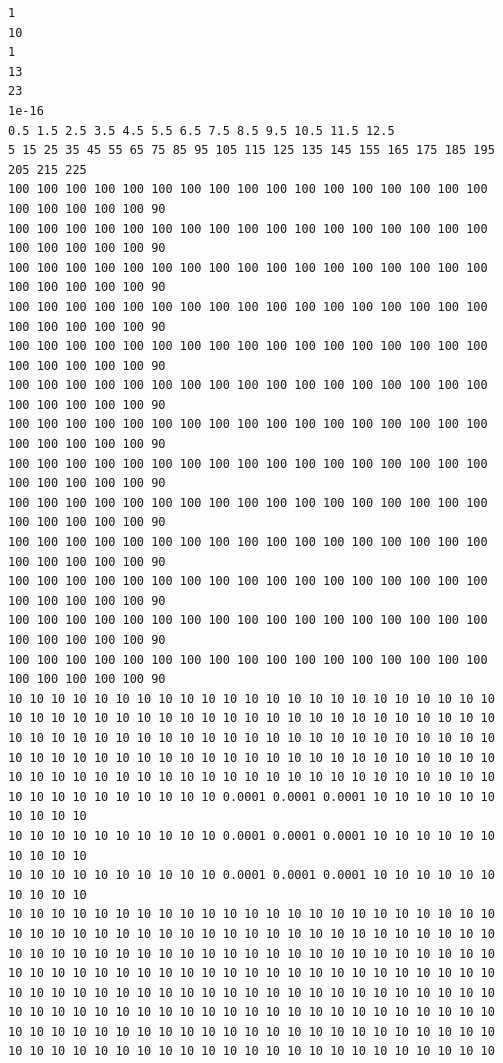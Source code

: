 \begin{lstlisting}[caption= Input file for 2D vertical slice confined aquifer with low permeability inclusion , label=lst:2DinclusionInput]
1
10
1
13
23
1e-16
0.5 1.5 2.5 3.5 4.5 5.5 6.5 7.5 8.5 9.5 10.5 11.5 12.5
5 15 25 35 45 55 65 75 85 95 105 115 125 135 145 155 165 175 185 195 205 215 225
100 100 100 100 100 100 100 100 100 100 100 100 100 100 100 100 100 100 100 100 100 100 90
100 100 100 100 100 100 100 100 100 100 100 100 100 100 100 100 100 100 100 100 100 100 90
100 100 100 100 100 100 100 100 100 100 100 100 100 100 100 100 100 100 100 100 100 100 90
100 100 100 100 100 100 100 100 100 100 100 100 100 100 100 100 100 100 100 100 100 100 90
100 100 100 100 100 100 100 100 100 100 100 100 100 100 100 100 100 100 100 100 100 100 90
100 100 100 100 100 100 100 100 100 100 100 100 100 100 100 100 100 100 100 100 100 100 90
100 100 100 100 100 100 100 100 100 100 100 100 100 100 100 100 100 100 100 100 100 100 90
100 100 100 100 100 100 100 100 100 100 100 100 100 100 100 100 100 100 100 100 100 100 90
100 100 100 100 100 100 100 100 100 100 100 100 100 100 100 100 100 100 100 100 100 100 90
100 100 100 100 100 100 100 100 100 100 100 100 100 100 100 100 100 100 100 100 100 100 90
100 100 100 100 100 100 100 100 100 100 100 100 100 100 100 100 100 100 100 100 100 100 90
100 100 100 100 100 100 100 100 100 100 100 100 100 100 100 100 100 100 100 100 100 100 90
100 100 100 100 100 100 100 100 100 100 100 100 100 100 100 100 100 100 100 100 100 100 90
10 10 10 10 10 10 10 10 10 10 10 10 10 10 10 10 10 10 10 10 10 10 10
10 10 10 10 10 10 10 10 10 10 10 10 10 10 10 10 10 10 10 10 10 10 10
10 10 10 10 10 10 10 10 10 10 10 10 10 10 10 10 10 10 10 10 10 10 10
10 10 10 10 10 10 10 10 10 10 10 10 10 10 10 10 10 10 10 10 10 10 10
10 10 10 10 10 10 10 10 10 10 10 10 10 10 10 10 10 10 10 10 10 10 10
10 10 10 10 10 10 10 10 10 10 0.0001 0.0001 0.0001 10 10 10 10 10 10 10 10 10 10
10 10 10 10 10 10 10 10 10 10 0.0001 0.0001 0.0001 10 10 10 10 10 10 10 10 10 10
10 10 10 10 10 10 10 10 10 10 0.0001 0.0001 0.0001 10 10 10 10 10 10 10 10 10 10
10 10 10 10 10 10 10 10 10 10 10 10 10 10 10 10 10 10 10 10 10 10 10
10 10 10 10 10 10 10 10 10 10 10 10 10 10 10 10 10 10 10 10 10 10 10
10 10 10 10 10 10 10 10 10 10 10 10 10 10 10 10 10 10 10 10 10 10 10
10 10 10 10 10 10 10 10 10 10 10 10 10 10 10 10 10 10 10 10 10 10 10
10 10 10 10 10 10 10 10 10 10 10 10 10 10 10 10 10 10 10 10 10 10 10
10 10 10 10 10 10 10 10 10 10 10 10 10 10 10 10 10 10 10 10 10 10 10
10 10 10 10 10 10 10 10 10 10 10 10 10 10 10 10 10 10 10 10 10 10 10
10 10 10 10 10 10 10 10 10 10 10 10 10 10 10 10 10 10 10 10 10 10 10

\end{lstlisting}
